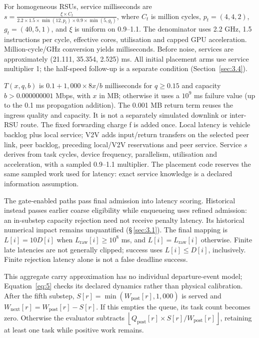 \documentclass[12pt,a4paper]{article}
\begin{document}
For homogeneous RSUs, service milliseconds are $s = \frac{\xi \times C_t}{2.2 \times 1.5 \times \min(12,p_t) \times 0.9 \times \min(5,g_t)}$, where $C_t$ is million cycles, $p_t=(4,4,2)$, $g_t=(40,5,1)$, and \ensuremath{\xi} is uniform on 0.9--1.1. The denominator uses 2.2 GHz, 1.5 instructions per cycle, effective cores, utilisation and capped GPU acceleration. Million-cycle/GHz conversion yields milliseconds. Before noise, services are approximately (21.111, 35.354, 2.525) ms. All initial placement arms use service multiplier 1; the half-speed follow-up is a separate condition (Section~\ref{sec:3.4}).

$T(x,q,b)$ is $0.1 + 1{,}000 \times 8x/b$ milliseconds for $q\geq 0.15$ and capacity $b>0.000000001$ Mbps, with $x$ in MB; otherwise it uses a $10^{9}$ ms failure value (up to the 0.1 ms propagation addition). The 0.001 MB return term reuses the ingress quality and capacity. It is not a separately simulated downlink or inter-RSU route. The fixed forwarding charge f is added once. Local latency is vehicle backlog plus local service; V2V adds input/return transfers on the selected peer link, peer backlog, preceding local/V2V reservations and peer service. Service $s$ derives from task cycles, device frequency, parallelism, utilisation and acceleration, with a sampled 0.9--1.1 multiplier. The placement code reserves the same sampled work used for latency: exact service knowledge is a declared information assumption.

The gate-enabled paths pass final admission into latency scoring. Historical  instead passes earlier coarse eligibility while enqueueing uses refined admission: an in-substep capacity rejection need not receive penalty latency. Its historical numerical impact remains unquantified (\S\,\ref{sec:3.1}). The final mapping is $L[i]=10D[i]$ when $L_{\mathrm{raw}}[i]\geq 10^{8}$ ms, and $L[i]=L_{\mathrm{raw}}[i]$ otherwise. Finite late latencies are not generally clipped; success uses $L[i]\leq D[i]$, inclusively. Finite rejection latency alone is not a false deadline success.

This aggregate carry approximation has no individual departure-event model; Equation~\eqref{eq:5} checks its declared dynamics rather than physical calibration. After the fifth substep, $S[r]=\min(W_{\mathrm{post}}[r],1{,}000)$ is served and $W_{\mathrm{next}}[r]=W_{\mathrm{post}}[r]-S[r]$. If this empties the queue, its task count becomes zero. Otherwise the evaluator subtracts $\left\lfloor Q_{\mathrm{post}}[r]\times S[r]/W_{\mathrm{post}}[r]\right\rfloor$, retaining at least one task while positive work remains.
\end{document}
